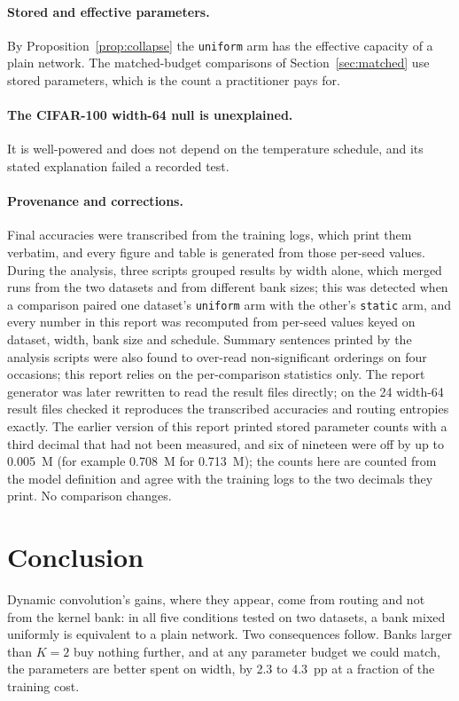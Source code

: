 \documentclass[10pt,a4paper]{article}
\begin{document}
\paragraph{Stored and effective parameters.} By
Proposition~\ref{prop:collapse} the \texttt{uniform} arm has the
effective capacity of a plain network. The matched-budget comparisons of
Section~\ref{sec:matched} use stored parameters, which is the count a
practitioner pays for.

\paragraph{The CIFAR-100 width-64 null is unexplained.} It is
well-powered and does not depend on the temperature schedule, and its
stated explanation failed a recorded test.

\paragraph{Provenance and corrections.} Final accuracies were transcribed
from the training logs, which print them verbatim, and every figure and
table is generated from those per-seed values. During the analysis, three
scripts grouped results by width alone, which merged runs from the two
datasets and from different bank sizes; this was detected when a
comparison paired one dataset's \texttt{uniform} arm with the other's
\texttt{static} arm, and every number in this report was recomputed from
per-seed values keyed on dataset, width, bank size and schedule. Summary
sentences printed by the analysis scripts were also found to over-read
non-significant orderings on four occasions; this report relies on the
per-comparison statistics only. The report generator was later
rewritten to read the result files directly; on the 24 width-64 result
files checked it reproduces the transcribed accuracies and routing
entropies exactly. The earlier version of this report printed stored
parameter counts with a third decimal that had not been measured, and six
of nineteen were off by up to \SI{0.005}{M} (for example \SI{0.708}{M}
for \SI{0.713}{M}); the counts here are counted from the model
definition and agree with the training logs to the two decimals they
print. No comparison changes.

\section{Conclusion}

Dynamic convolution's gains, where they appear, come from routing and not
from the kernel bank: in all five conditions tested on two datasets, a
bank mixed uniformly is equivalent to a plain network. Two consequences
follow. Banks larger than $K=2$ buy nothing further, and at any
parameter budget we could match, the parameters are better spent on
width, by 2.3 to \SI{4.3}{pp} at a fraction of the training cost.
\end{document}
